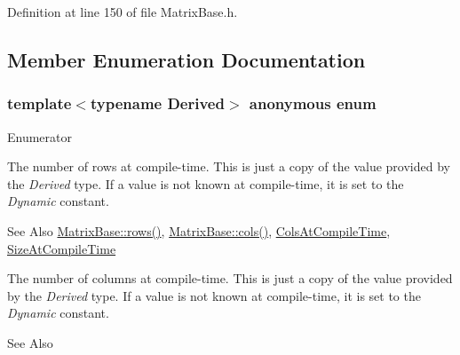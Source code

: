 Definition at line 150 of file Matrix\-Base.\-h.



\subsection{Member Enumeration Documentation}
\hypertarget{class_matrix_base_aaa53a8ec1bc1ba52b1e50631dac15d6d}{\subsubsection[{anonymous enum}]{\setlength{\rightskip}{0pt plus 5cm}template$<$typename Derived$>$ anonymous enum}}\label{class_matrix_base_aaa53a8ec1bc1ba52b1e50631dac15d6d}
\begin{Desc}
\item[Enumerator]\par
\begin{description}
\item[{\em 
\hypertarget{class_matrix_base_aaa53a8ec1bc1ba52b1e50631dac15d6da10c48c1361376cbd5ef62a18966f2691}{Rows\-At\-Compile\-Time}\label{class_matrix_base_aaa53a8ec1bc1ba52b1e50631dac15d6da10c48c1361376cbd5ef62a18966f2691}
}]The number of rows at compile-\/time. This is just a copy of the value provided by the {\itshape Derived} type. If a value is not known at compile-\/time, it is set to the {\itshape Dynamic} constant. \begin{DoxySeeAlso}{See Also}
\hyperlink{class_matrix_base_ae82810ba95da637cdf434b4274083723}{Matrix\-Base\-::rows()}, \hyperlink{class_matrix_base_abe5381b539f87237647bc651a1ac0364}{Matrix\-Base\-::cols()}, \hyperlink{class_matrix_base_aaa53a8ec1bc1ba52b1e50631dac15d6da359babfd1277ae780433d99b383e00e8}{Cols\-At\-Compile\-Time}, \hyperlink{class_matrix_base_aaa53a8ec1bc1ba52b1e50631dac15d6da74e612bdee777aa1924cbd37b5e298a4}{Size\-At\-Compile\-Time} 
\end{DoxySeeAlso}
\item[{\em 
\hypertarget{class_matrix_base_aaa53a8ec1bc1ba52b1e50631dac15d6da359babfd1277ae780433d99b383e00e8}{Cols\-At\-Compile\-Time}\label{class_matrix_base_aaa53a8ec1bc1ba52b1e50631dac15d6da359babfd1277ae780433d99b383e00e8}
}]The number of columns at compile-\/time. This is just a copy of the value provided by the {\itshape Derived} type. If a value is not known at compile-\/time, it is set to the {\itshape Dynamic} constant. \begin{DoxySeeAlso}{See Also}

\end{DoxySeeAlso}
\end{description}
\end{Desc}
